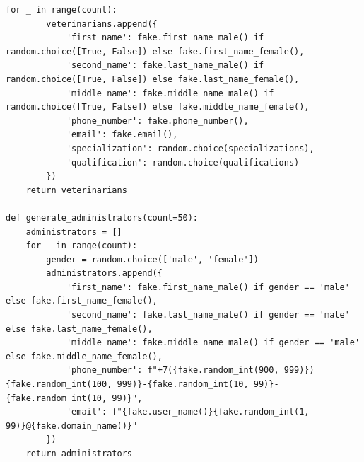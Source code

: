 \documentclass[a4paper]{article}
\begin{document}
\begin{lstlisting}[caption = Генерация значений для таблиц, basicstyle= \scriptsize \ttfamily]
    for _ in range(count):
        veterinarians.append({
            'first_name': fake.first_name_male() if random.choice([True, False]) else fake.first_name_female(),
            'second_name': fake.last_name_male() if random.choice([True, False]) else fake.last_name_female(),
            'middle_name': fake.middle_name_male() if random.choice([True, False]) else fake.middle_name_female(),
            'phone_number': fake.phone_number(),
            'email': fake.email(),
            'specialization': random.choice(specializations),
            'qualification': random.choice(qualifications)
        })
    return veterinarians

def generate_administrators(count=50):
    administrators = []
    for _ in range(count):
        gender = random.choice(['male', 'female'])
        administrators.append({
            'first_name': fake.first_name_male() if gender == 'male' else fake.first_name_female(),
            'second_name': fake.last_name_male() if gender == 'male' else fake.last_name_female(),
            'middle_name': fake.middle_name_male() if gender == 'male' else fake.middle_name_female(),
            'phone_number': f"+7({fake.random_int(900, 999)}){fake.random_int(100, 999)}-{fake.random_int(10, 99)}-{fake.random_int(10, 99)}",
            'email': f"{fake.user_name()}{fake.random_int(1, 99)}@{fake.domain_name()}"
        })
    return administrators



\end{lstlisting}
\end{document}
